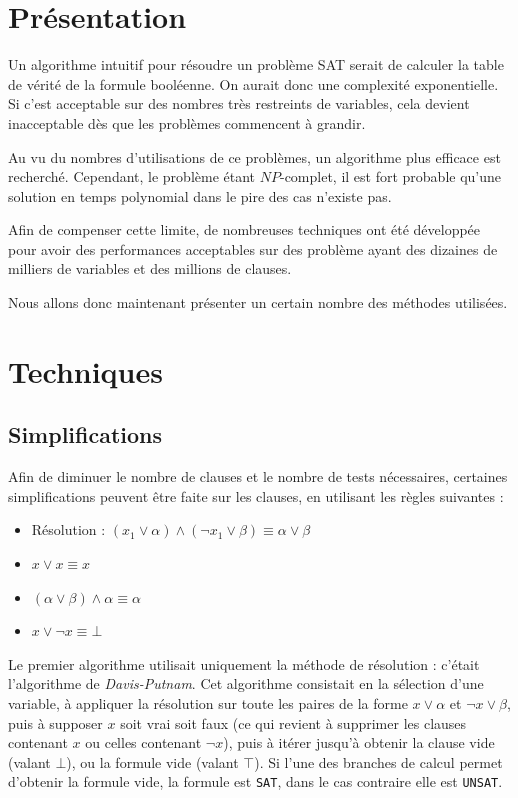 \section{Présentation}
Un algorithme intuitif pour résoudre un problème SAT serait de calculer la
table de vérité de la formule booléenne. On aurait donc une complexité
exponentielle. Si c'est acceptable sur des nombres très restreints de
variables, cela devient inacceptable dès que les problèmes commencent à
grandir. 

Au vu du nombres d'utilisations de ce problèmes, un algorithme plus efficace
est recherché. Cependant, le problème étant $NP$-complet, il est fort probable
qu'une solution en temps polynomial dans le pire des cas n'existe pas.

Afin de compenser cette limite, de nombreuses techniques ont été développée
pour avoir des performances acceptables  sur des problème ayant des dizaines de milliers de
variables et des millions de clauses.

Nous allons donc maintenant présenter un certain nombre des méthodes utilisées.

\section{Techniques}
\subsection{Simplifications}
Afin de diminuer le nombre de clauses et le nombre de tests nécessaires,
certaines simplifications peuvent être faite sur les clauses, en utilisant les
règles suivantes : \begin{itemize}
    \item Résolution :
           $(x_1\vee\alpha) \wedge (\neg x_1\vee\beta) \equiv \alpha\vee\beta$
    \item $x \vee x \equiv x$
    \item $(\alpha\vee\beta)\wedge\alpha\equiv\alpha$
    \item $x\vee\neg x \equiv \bot$
\end{itemize}

Le premier algorithme utilisait uniquement la méthode de résolution : c'était
l'algorithme de \emph{Davis-Putnam}\cite{dp60}. Cet algorithme
consistait en la sélection d'une variable, à appliquer la résolution sur toute
les paires de la forme $x\vee\alpha$ et $\neg x\vee\beta$, puis à supposer
$x$ soit vrai soit faux (ce qui revient à supprimer les clauses contenant $x$
ou celles contenant $\neg x$), puis à itérer jusqu'à obtenir la clause vide
(valant $\bot$), ou la formule vide (valant $\top$). Si l'une des branches de
calcul permet d'obtenir la formule vide, la formule est \texttt{SAT}, dans le
cas contraire elle est \texttt{UNSAT}.

